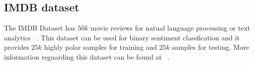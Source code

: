 \subsection{IMDB dataset}
\label{subsec:imdb}
The IMDB Dataset has $50k$ movie reviews for natual language processing or text analytics ~\cite{kaggle}. This dataset can be used for binary sentiment classfication and it provides $25k$ highly polar samples for training and $25k$ samples for testing. More information reguarding this dataset can be found at ~\cite{refe}.
